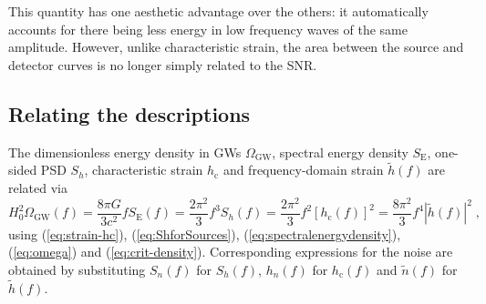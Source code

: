 This quantity has one aesthetic advantage over the others: it automatically accounts for there being less energy in low frequency waves of the same amplitude. However, unlike characteristic strain, the area between the source and detector curves is no longer simply related to the SNR.

\subsection{Relating the descriptions}

The dimensionless energy density in GWs $\Omega_{\mathrm{GW}}$, spectral energy density $S_{\mathrm{E}}$, one-sided PSD $S_{h}$, characteristic strain $h_\mathrm{c}$ and frequency-domain strain $\tilde{h}(f)$ are related via
\begin{equation}\label{eq:differentdescriptions}
H_0^2\Omega_\mathrm{GW}(f)= \frac{8 \pi G}{3 c^{2}} fS_{\mathrm{E}}(f) = \frac{2\pi^2}{3} f^3 S_h(f) = \frac{2\pi^2}{3} f^2 \left[h_\mathrm{c}(f)\right]^2 = \frac{8\pi^2}{3} f^4 \left|\tilde{h}(f)\right|^2\; ,
\end{equation}
using (\ref{eq:strain-hc}), (\ref{eq:ShforSources}), (\ref{eq:spectralenergydensity}), (\ref{eq:omega}) and (\ref{eq:crit-density}).
Corresponding expressions for the noise are obtained by substituting $S_{n}(f)$ for $S_h(f)$, $h_{n}(f)$ for $h_\mathrm{c}(f)$ and $\tilde{n}(f)$ for $\tilde{h}(f)$. 

